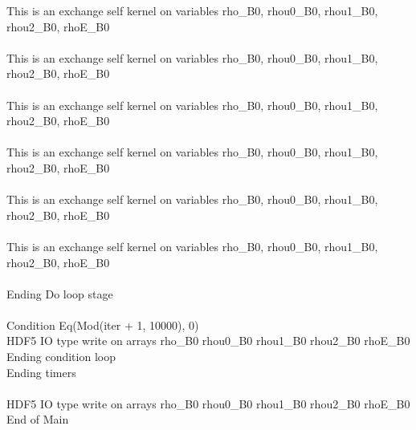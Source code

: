 \documentclass{article}
\begin{document}
\noindent This is an exchange self kernel on variables rho_B0, rhou0_B0, rhou1_B0, rhou2_B0, rhoE_B0\\\\\noindent This is an exchange self kernel on variables rho_B0, rhou0_B0, rhou1_B0, rhou2_B0, rhoE_B0\\\\\noindent This is an exchange self kernel on variables rho_B0, rhou0_B0, rhou1_B0, rhou2_B0, rhoE_B0\\\\\noindent This is an exchange self kernel on variables rho_B0, rhou0_B0, rhou1_B0, rhou2_B0, rhoE_B0\\\\\noindent This is an exchange self kernel on variables rho_B0, rhou0_B0, rhou1_B0, rhou2_B0, rhoE_B0\\\\\noindent This is an exchange self kernel on variables rho_B0, rhou0_B0, rhou1_B0, rhou2_B0, rhoE_B0\\\\\noindent Ending Do loop stage\\
\\\noindent Condition Eq(Mod(iter + 1, 10000), 0)\\\noindent HDF5 IO type write on arrays rho_B0 rhou0_B0 rhou1_B0 rhou2_B0 rhoE_B0\\\noindent Ending condition loop %
\\\noindent Ending timers\\
\\\noindent HDF5 IO type write on arrays rho_B0 rhou0_B0 rhou1_B0 rhou2_B0 rhoE_B0\\\noindent End of Main\\
\end{document}
